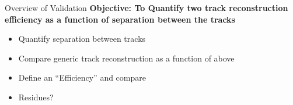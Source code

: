 \begin{frame}{Overview of Validation }
    \textbf{Objective: To Quantify two track reconstruction efficiency as a function of separation between the tracks}
    \begin{itemize}
        \item Quantify separation between tracks
        \item Compare generic track reconstruction as a function of above
        \item Define an ``Efficiency'' and compare
        \item Residues? 

        
    \end{itemize}

\end{frame}